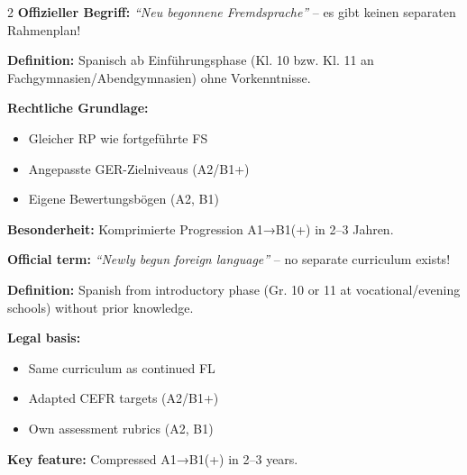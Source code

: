 \documentclass[10pt,a4paper]{article}
\begin{document}
\begin{paracol}{2}
\small
\textbf{Offizieller Begriff:} \textit{``Neu begonnene Fremdsprache''} -- es gibt keinen separaten Rahmenplan!\footnotemark[1]

\textbf{Definition:} Spanisch ab Einführungsphase (Kl. 10 bzw. Kl. 11 an Fachgymnasien/Abendgymnasien) ohne Vorkenntnisse.

\textbf{Rechtliche Grundlage:}
\begin{itemize}[noitemsep,topsep=2pt]
\item Gleicher RP wie fortgeführte FS
\item Angepasste GER-Zielniveaus (A2/B1+)
\item Eigene Bewertungsbögen (A2, B1)
\end{itemize}

\textbf{Besonderheit:} Komprimierte Progression A1→B1(+) in 2--3 Jahren.\footnotemark[2]

\switchcolumn

\small\color{english}
\textbf{Official term:} \textit{``Newly begun foreign language''} -- no separate curriculum exists!\footnotemark[1]

\textbf{Definition:} Spanish from introductory phase (Gr. 10 or 11 at vocational/evening schools) without prior knowledge.

\textbf{Legal basis:}
\begin{itemize}[noitemsep,topsep=2pt]
\item Same curriculum as continued FL
\item Adapted CEFR targets (A2/B1+)
\item Own assessment rubrics (A2, B1)
\end{itemize}

\textbf{Key feature:} Compressed A1→B1(+) in 2--3 years.\footnotemark[2]

\end{paracol}

\end{document}
